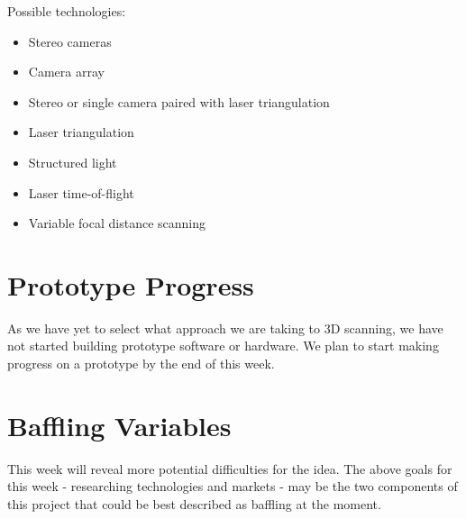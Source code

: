 \documentclass[10pt]{article}
\begin{document}
Possible technologies:
\begin{itemize}
\item Stereo cameras
\item Camera array
\item Stereo or single camera paired with laser triangulation
\item Laser triangulation
\item Structured light
\item Laser time-of-flight
\item Variable focal distance scanning
\end{itemize}

\section{Prototype Progress} As we have yet to select what approach we are
taking to 3D scanning, we have not started building prototype software or
hardware. We plan to start making progress on a prototype by the end of this
week.

\section{Baffling Variables}
This week will reveal more potential difficulties for the idea. The above goals for this week - researching technologies and markets - may be the two components of this project that could be best described as baffling at the moment.

\newpage
\end{document}
